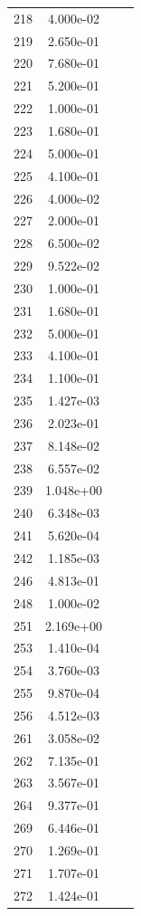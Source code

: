 \documentclass[12pt]{article}
\begin{document}
\begin{longtable}{@{}cccc@{}}
218 & 4.000e-02 &  &  \\
219 & 2.650e-01 &  &  \\
220 & 7.680e-01 &  &  \\
221 & 5.200e-01 &  &  \\
222 & 1.000e-01 &  &  \\
223 & 1.680e-01 &  &  \\
224 & 5.000e-01 &  &  \\
225 & 4.100e-01 &  &  \\
226 & 4.000e-02 &  &  \\
227 & 2.000e-01 &  &  \\
228 & 6.500e-02 &  &  \\
229 & 9.522e-02 &  &  \\
230 & 1.000e-01 &  &  \\
231 & 1.680e-01 &  &  \\
232 & 5.000e-01 &  &  \\
233 & 4.100e-01 &  &  \\
234 & 1.100e-01 &  &  \\
235 & 1.427e-03 &  &  \\
236 & 2.023e-01 &  &  \\
237 & 8.148e-02 &  &  \\
238 & 6.557e-02 &  &  \\
239 & 1.048e+00 &  &  \\
240 & 6.348e-03 &  &  \\
241 & 5.620e-04 &  &  \\
242 & 1.185e-03 &  &  \\
246 & 4.813e-01 &  &  \\
248 & 1.000e-02 &  &  \\
251 & 2.169e+00 &  &  \\
253 & 1.410e-04 &  &  \\
254 & 3.760e-03 &  &  \\
255 & 9.870e-04 &  &  \\
256 & 4.512e-03 &  &  \\
261 & 3.058e-02 &  &  \\
262 & 7.135e-01 &  &  \\
263 & 3.567e-01 &  &  \\
264 & 9.377e-01 &  &  \\
269 & 6.446e-01 &  &  \\
270 & 1.269e-01 &  &  \\
271 & 1.707e-01 &  &  \\
272 & 1.424e-01 &  &  \\

\end{longtable}
\end{document}
